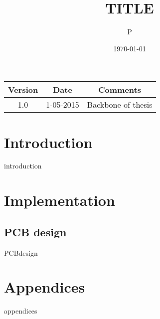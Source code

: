 \documentclass[parskip=full,11pt,a4paper,titlepage]{article}
\title{TITLE}
\author{P}
\date{\today}
\begin{document}



\clearpage

\begin{center}
\begin{tabular}{|c|c|c|}
\hline
	Version	& Date & Comments \\
\hline
	1.0		& 1-05-2015	 & Backbone of thesis \\
\hline
\end{tabular}
\end{center}
\clearpage


\tableofcontents
\clearpage

\section{Introduction}
{introduction}
\clearpage


\section{Implementation}

\subsection{PCB design}
{PCBdesign}
\clearpage

\section{Appendices}
{appendices}
\clearpage









\end{document}
